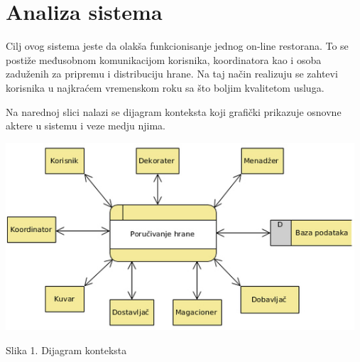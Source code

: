 \usepackage[figurename=Dijagram]{caption}

\section{Analiza sistema}
Cilj ovog sistema jeste da olakša funkcionisanje jednog on-line restorana. To se postiže međusobnom komunikacijom korisnika, koordinatora kao i osoba zaduženih za pripremu i distribuciju hrane. Na taj način realizuju se zahtevi korisnika u najkraćem vremenskom roku sa što boljim kvalitetom usluga.

Na narednoj slici nalazi se dijagram konteksta koji grafički prikazuje osnovne aktere u sistemu i veze medju njima.


\begin{center}
\includegraphics[width = 130mm]{slike/DC.jpg}
\caption{Slika 1. Dijagram konteksta}
\end{center}








